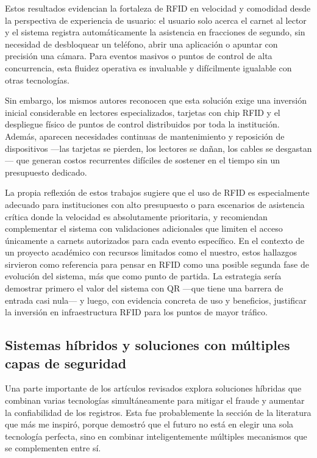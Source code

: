 Estos resultados evidencian la fortaleza de RFID en velocidad y comodidad desde la perspectiva de experiencia de usuario: el usuario solo acerca el carnet al lector y el sistema registra automáticamente la asistencia en fracciones de segundo, sin necesidad de desbloquear un teléfono, abrir una aplicación o apuntar con precisión una cámara. Para eventos masivos o puntos de control de alta concurrencia, esta fluidez operativa es invaluable y difícilmente igualable con otras tecnologías.

Sin embargo, los mismos autores reconocen que esta solución exige una inversión inicial considerable en lectores especializados, tarjetas con chip RFID y el despliegue físico de puntos de control distribuidos por toda la institución. Además, aparecen necesidades continuas de mantenimiento y reposición de dispositivos —las tarjetas se pierden, los lectores se dañan, los cables se desgastan— que generan costos recurrentes difíciles de sostener en el tiempo sin un presupuesto dedicado.

La propia reflexión de estos trabajos sugiere que el uso de RFID es especialmente adecuado para instituciones con alto presupuesto o para escenarios de asistencia crítica donde la velocidad es absolutamente prioritaria, y recomiendan complementar el sistema con validaciones adicionales que limiten el acceso únicamente a carnets autorizados para cada evento específico. En el contexto de un proyecto académico con recursos limitados como el nuestro, estos hallazgos sirvieron como referencia para pensar en RFID como una posible segunda fase de evolución del sistema, más que como punto de partida. La estrategia sería demostrar primero el valor del sistema con QR —que tiene una barrera de entrada casi nula— y luego, con evidencia concreta de uso y beneficios, justificar la inversión en infraestructura RFID para los puntos de mayor tráfico.

\subsection{Sistemas híbridos y soluciones con múltiples capas de seguridad}

Una parte importante de los artículos revisados explora soluciones híbridas que combinan varias tecnologías simultáneamente para mitigar el fraude y aumentar la confiabilidad de los registros. Esta fue probablemente la sección de la literatura que más me inspiró, porque demostró que el futuro no está en elegir una sola tecnología perfecta, sino en combinar inteligentemente múltiples mecanismos que se complementen entre sí.

